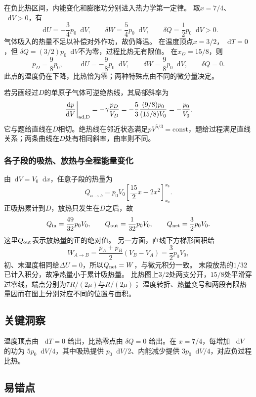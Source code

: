 \documentclass[UTF8,fontset=fandol,a4paper,11pt]{ctexart}
\newcommand{\dd}{\mathop{}\!\mathrm{d}}
\begin{document}
在负比热区间，内能变化和膨胀功分别进入热力学第一定律。
取$x=7/4$、$\dd V>0$，有
\[
\dd U=-\frac34p_0\dd V,\qquad
\delta W=\frac54p_0\dd V,\qquad
\delta Q=\frac12p_0\dd V>0.
\]
气体吸入的热量不足以补偿对外作功，故仍降温。
在温度顶点$x=3/2$，$\dd T=0$，但
$\delta Q=(3/2)p_0\dd V$不为零，过程比热无有限值。
在$x_D=15/8$，则
\[
p_D=\frac98p_0,\qquad
\dd U=-\frac98p_0\dd V,\qquad
\delta W=\frac98p_0\dd V,\qquad\delta Q=0.
\]
此点的温度仍在下降，比热恰为零；两种特殊点由不同的微分量决定。

若另画经过$D$的单原子气体可逆绝热线，其局部斜率为
\[
\left.\frac{\dd p}{\dd V}\right|_{\rm ad,D}
=-\gamma\frac{p_D}{V_D}
=-\frac53\frac{(9/8)p_0}{(15/8)V_0}
=-\frac{p_0}{V_0}.
\]
它与题给直线在$D$相切。绝热线在邻近状态满足$pV^{5/3}=\mathrm{const}$，题给过程满足直线关系；两条曲线在$D$处有相同斜率，曲率则不同。

\subsubsection*{各子段的吸热、放热与全程能量变化}
由$\dd V=V_0\dd x$，任意子段的热量为
\[
Q_{a\to b}=p_0V_0
 \left[\frac{15}{2}x-2x^2\right]_{x_a}^{x_b}.
\]
正吸热累计到$D$，放热只发生在$D$之后，故
\[
Q_{\rm in}=\frac{49}{32}p_0V_0,\qquad
Q_{\rm out}=\frac1{32}p_0V_0,\qquad
Q_{\rm net}=\frac32p_0V_0.
\]
这里$Q_{\rm out}$表示放热量的正的绝对值。
另一方面，直线下方梯形面积给
\[
W_{A\to B}=\frac{p_A+p_B}{2}(V_B-V_A)=\frac32p_0V_0,
\]
初、末温度相同给$\Delta U=0$，所以$Q_{\rm net}=W$，与微元积分一致。
末段放热的$1/32$已计入积分，故净热量小于累计吸热量。
比热图上$3/2$处两支分开，$15/8$处平滑穿过零线，端点分别为$7R/(2\mu)$与$R/(2\mu)$；
温度转折、热量变号和两段有限热量因而在图上分别对应不同的位置与面积。




\subsection*{关键洞察}

温度顶点由 $\dd T=0$ 给出，比热零点由 $\delta Q=0$ 给出。在 $x=7/4$，每增加 $\dd V$ 的功为 $5p_0\dd V/4$，其中吸热提供 $p_0\dd V/2$、内能减少提供 $3p_0\dd V/4$，对应负过程比热。



\subsection*{易错点}
\end{document}
